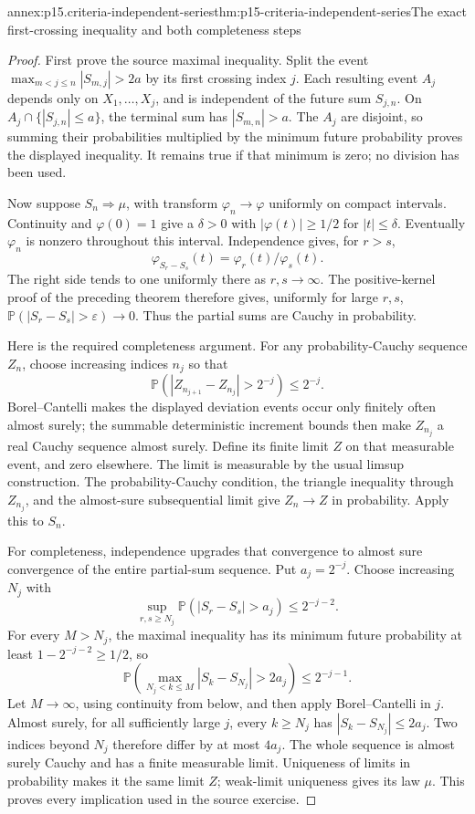 \begin{annexitem}{annex:p15.criteria-independent-series}{thm:p15-criteria-independent-series}{The exact first-crossing inequality and both completeness steps}
\begin{proof}
First prove the source maximal inequality. Split the
event \(\max_{m<j\leq n}|S_{m,j}|>2a\) by its first
crossing index \(j\). Each resulting event \(A_j\)
depends only on \(X_1,\ldots,X_j\), and is independent
of the future sum \(S_{j,n}\).
On \(A_j\cap\{|S_{j,n}|\leq a\}\), the terminal sum
has \(|S_{m,n}|>a\). The \(A_j\) are disjoint, so
summing their probabilities multiplied by the minimum
future probability proves the displayed inequality.
It remains true if that minimum is zero; no division
has been used.

Now suppose \(S_n\Rightarrow\mu\), with transform
\(\varphi_n\to\varphi\) uniformly on compact intervals.
Continuity and \(\varphi(0)=1\) give a \(\delta>0\)
with \(|\varphi(t)|\geq1/2\) for \(|t|\leq\delta\).
Eventually \(\varphi_n\) is nonzero throughout this
interval. Independence gives, for \(r>s\),
\[
 \varphi_{S_r-S_s}(t)=\varphi_r(t)/\varphi_s(t).
\]
The right side tends to one uniformly there as
\(r,s\to\infty\). The positive-kernel proof of the
preceding theorem therefore gives, uniformly for
large \(r,s\),
\(\mathbb P(|S_r-S_s|>\varepsilon)\to0\).
Thus the partial sums are Cauchy in probability.

Here is the required completeness argument. For any
probability-Cauchy sequence \(Z_n\), choose increasing
indices \(n_j\) so that
\[
 \mathbb P(|Z_{n_{j+1}}-Z_{n_j}|>2^{-j})\leq2^{-j}.
\]
Borel--Cantelli makes the displayed deviation events occur
only finitely often almost surely; the summable deterministic
increment bounds then make \(Z_{n_j}\) a real Cauchy
sequence almost surely. Define its finite limit \(Z\)
on that measurable event, and zero elsewhere.
The limit is measurable by the usual limsup construction.
The probability-Cauchy condition, the triangle inequality
through \(Z_{n_j}\), and the almost-sure subsequential
limit give \(Z_n\to Z\) in probability.
Apply this to \(S_n\).

For completeness, independence upgrades that convergence
to almost sure convergence of the entire partial-sum
sequence. Put \(a_j=2^{-j}\).
Choose increasing \(N_j\) with
\[
 \sup_{r,s\geq N_j}
 \mathbb P(|S_r-S_s|>a_j)\leq2^{-j-2}.
\]
For every \(M>N_j\), the maximal inequality has its
minimum future probability at least \(1-2^{-j-2}\geq1/2\),
so
\[
 \mathbb P\!\left(\max_{N_j<k\leq M}|S_k-S_{N_j}|>2a_j\right)
                                  \leq2^{-j-1}.
\]
Let \(M\to\infty\), using continuity from below, and
then apply Borel--Cantelli in \(j\).
Almost surely, for all sufficiently large \(j\),
every \(k\geq N_j\) has \(|S_k-S_{N_j}|\leq2a_j\).
Two indices beyond \(N_j\) therefore differ by at
most \(4a_j\). The whole sequence is almost surely
Cauchy and has a finite measurable limit.
Uniqueness of limits in probability makes it the same
limit \(Z\); weak-limit uniqueness gives its law \(\mu\).
This proves every implication used in the source exercise.
\end{proof}
\end{annexitem}

